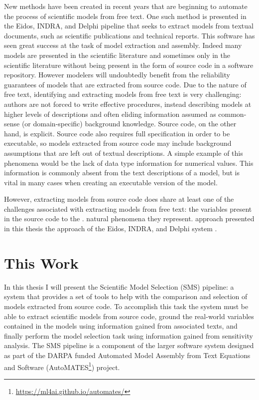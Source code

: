 New methods have been created in recent years that are beginning to automate the process of  %
scientific models from free text. One such method is presented in the Eidos, INDRA, and Delphi \citep{EidosIndraDelphi} pipeline that seeks to extract models from textual documents, such as scientific publications and technical reports.
This software has seen great success at the task of model extraction and assembly.
Indeed many models are presented in the scientific literature and sometimes only in the scientific literature without being present in the form of source code in a software repository.
However modelers will undoubtedly benefit from the reliability guarantees of models that are extracted from source code.
Due to the nature of free text, identifying and extracting models from free text is very challenging: authors are not forced to write effective procedures, instead describing models at higher levels of descriptions and often eliding information assumed as common-sense (or domain-specific) background knowledge.
Source code, on the other hand, is explicit.
Source code also requires full specification in order to be executable, so models extracted from source code may include background assumptions that are left out of textual descriptions.
A simple example of this phenomena would be the lack of data type information for numerical values. This information is commonly absent from the text descriptions of a model, but is vital in many cases when creating an executable version of the model.

However, extracting models from source code does share at least one of the challenges associated with extracting models from free text:
 the variables present in the source code to the .
natural phenomena they represent.
 approach presented in this thesis
 the approach of the Eidos, INDRA, and Delphi system .

\section{This Work\label{sec:this_work}}
In this thesis I will present the Scientific Model Selection (SMS) pipeline: a system that provides a set of tools to help with the comparison and selection of models extracted from source code.
To accomplish this task the system must be able to extract scientific models from source code, ground the real-world variables contained in the models using information gained from associated texts, and finally perform the model selection task using information gained from sensitivity analysis.
The SMS pipeline is a component of the larger software system designed as part of the DARPA funded Automated Model Assembly from Text Equations and Software (AutoMATES\footnote{\url{https://ml4ai.github.io/automates/}}) project.

